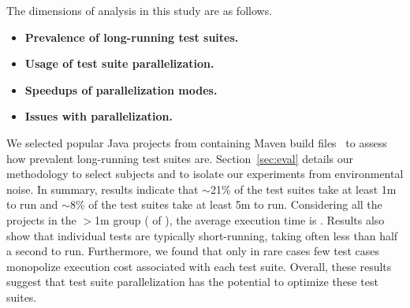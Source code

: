 The dimensions of analysis in this study are as follows.

\begin{itemize}
\item \textbf{Prevalence of long-running test suites.}
\item \textbf{Usage of test suite parallelization.}  
\item \textbf{Speedups of parallelization modes.}
\item \textbf{Issues with parallelization.}    
\end{itemize}  




We selected \numSubjs{} popular Java projects from \github{}
containing Maven build files~\cite{maven} to assess how prevalent
long-running test suites are.  Section~\ref{sec:eval} details our
methodology to select subjects and to isolate our experiments from
environmental noise.  In summary, results indicate that $\sim$21\% of
the test suites take at least 1m to run and $\sim$8\% of the test
suites take at least 5m to run.  Considering all the \numMedLong{}
projects in the $>$1m group (\percentMedLongRunning{} of
\numSubjs{}), the
average execution time is \averageMedLongRunning{}.  Results also show
that individual tests are typically short-running, taking often less
than half a second to run.  Furthermore, we found that only in rare
cases few test cases monopolize execution cost associated with each
test suite.  Overall, these results suggest that test suite
parallelization has the potential to optimize these test suites.

